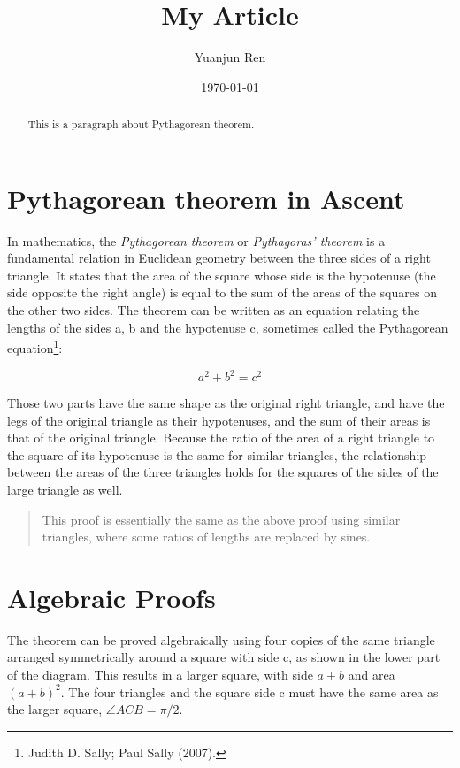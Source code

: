 \documentclass[11pt]{article}
\title{My Article}
\author{Yuanjun Ren}
\date{\today}
\begin{document}
\maketitle

\begin{abstract}
    This is a paragraph about Pythagorean theorem.
\end{abstract}

\newpage

\tableofcontents
\newpage

\section{Pythagorean theorem in Ascent}
In mathematics, the \emph{Pythagorean theorem} or \emph{Pythagoras' theorem} is a fundamental relation in Euclidean geometry between the three sides of a right triangle. It states that the area of the square whose side is the hypotenuse (the side opposite the right angle) is equal to the sum of the areas of the squares on the other two sides. The theorem can be written as an equation relating the lengths of the sides a, b and the hypotenuse c, sometimes called the Pythagorean equation\footnote{Judith D. Sally; Paul Sally (2007).}:

$$
a^2 + b^2 = c^2
$$

Those two parts have the same shape as the original right triangle, and have the legs of the original triangle as their hypotenuses, and the sum of their areas is that of the original triangle. Because the ratio of the area of a right triangle to the square of its hypotenuse is the same for similar triangles, the relationship between the areas of the three triangles holds for the squares of the sides of the large triangle as well.

\begin{quote}
This proof is essentially the same as the above proof using similar triangles, where some ratios of lengths are replaced by sines.
\end{quote}


\section{Algebraic Proofs}
The theorem can be proved algebraically using four copies of the same triangle arranged symmetrically around a square with side c, as shown in the lower part of the diagram. This results in a larger square, with side $a + b$ and area $(a + b)^2$. The four triangles and the square side c must have the same area as the larger square, $\angle ACB = \pi / 2$.
\end{document}
